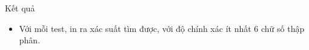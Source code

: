 Kết quả
\begin{itemize}
	\item     Với mỗi test, in ra xác suất tìm được, với độ chính xác ít nhất 6 chữ số thập phân.   
\end{itemize}